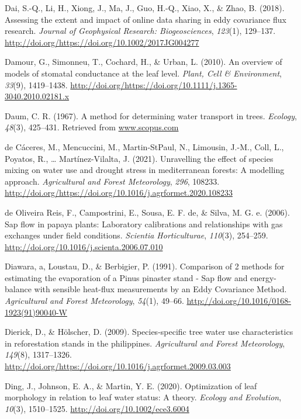 \documentclass[11pt,twoside]{reedthesis}
\begin{document}
\hypertarget{ref-Dai2018}{}
Dai, S.-Q., Li, H., Xiong, J., Ma, J., Guo, H.-Q., Xiao, X., \& Zhao, B.
(2018). Assessing the extent and impact of online data sharing in eddy
covariance flux research. \emph{Journal of Geophysical Research:
Biogeosciences}, \emph{123}(1), 129--137.
\url{http://doi.org/https://doi.org/10.1002/2017JG004277}

\hypertarget{ref-Damour2010}{}
Damour, G., Simonneu, T., Cochard, H., \& Urban, L. (2010). An overview
of models of stomatal conductance at the leaf level. \emph{Plant, Cell
\& Environment}, \emph{33}(9), 1419--1438.
\url{http://doi.org/https://doi.org/10.1111/j.1365-3040.2010.02181.x}

\hypertarget{ref-Daum1967}{}
Daum, C. R. (1967). A method for determining water transport in trees.
\emph{Ecology}, \emph{48}(3), 425--431. Retrieved from
\url{www.scopus.com}

\hypertarget{ref-decaceres2021}{}
de Cáceres, M., Mencuccini, M., Martin-StPaul, N., Limousin, J.-M.,
Coll, L., Poyatos, R., \ldots{} Martínez-Vilalta, J. (2021). Unravelling
the effect of species mixing on water use and drought stress in
mediterranean forests: A modelling approach. \emph{Agricultural and
Forest Meteorology}, \emph{296}, 108233.
\url{http://doi.org/https://doi.org/10.1016/j.agrformet.2020.108233}

\hypertarget{ref-DeOliveiraReis2006}{}
de Oliveira Reis, F., Campostrini, E., Sousa, E. F. de, \& Silva, M. G.
e. (2006). Sap flow in papaya plants: Laboratory calibrations and
relationships with gas exchanges under field conditions. \emph{Scientia
Horticulturae}, \emph{110}(3), 254--259.
\url{http://doi.org/10.1016/j.scienta.2006.07.010}

\hypertarget{ref-Diawara1991}{}
Diawara, a, Loustau, D., \& Berbigier, P. (1991). Comparison of 2
methods for estimating the evaporation of a Pinus pinaster stand - Sap
flow and energy-balance with sensible heat-flux measurements by an Eddy
Covariance Method. \emph{Agricultural and Forest Meteorology},
\emph{54}(1), 49--66. \url{http://doi.org/10.1016/0168-1923(91)90040-W}

\hypertarget{ref-Dierick2009}{}
Dierick, D., \& Hölscher, D. (2009). Species-specific tree water use
characteristics in reforestation stands in the philippines.
\emph{Agricultural and Forest Meteorology}, \emph{149}(8), 1317--1326.
\url{http://doi.org/https://doi.org/10.1016/j.agrformet.2009.03.003}

\hypertarget{ref-ding_optimization_2020}{}
Ding, J., Johnson, E. A., \& Martin, Y. E. (2020). Optimization of leaf
morphology in relation to leaf water status: A theory. \emph{Ecology and
Evolution}, \emph{10}(3), 1510--1525.
\url{http://doi.org/10.1002/ece3.6004}
\end{document}
